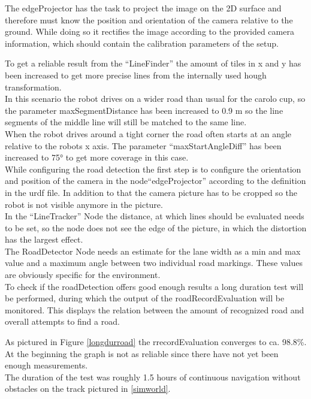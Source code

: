 The edgeProjector has the task to project the image on the 2D surface and therefore must know the position and orientation of the camera relative to the ground. While doing so it rectifies the image according to the provided camera information, which should contain the calibration parameters of the setup.

To get a reliable result from the ``LineFinder'' the amount of tiles in x and y has been increased to get more precise lines from the internally used hough transformation.\\
In this scenario the robot drives on a wider road than usual for the carolo cup, so the parameter maxSegmentDistance has been increased to 0.9 m so the line segments of the middle line will still be matched to the same line.\\
When the robot drives around a tight corner the road often starts at an angle relative to the robots x axis. The parameter ``maxStartAngleDiff'' has been increased to 75° to get more coverage in this case.\\

While configuring the road detection the first step is to configure the orientation and position of the camera in the node``edgeProjector'' according to the definition in the urdf file. In addition to that the camera picture has to be cropped so the robot is not visible anymore in the picture.\\

In the ``LineTracker'' Node the distance, at which lines should be evaluated needs to be set, so the node does not see the edge of the picture, in which the distortion has the largest effect.\\


The RoadDetector Node needs an estimate for the lane width as a min and max value and a maximum angle between two individual road markings. These values are obviously specific for the environment.\\

To check if the roadDetection offers good enough results a long duration test will be performed, during which the output of the roadRecordEvaluation will be monitored. This displays the relation between the amount of recognized road and overall attempts to find a road.

As pictured in Figure \ref{longdurroad} the rrecordEvaluation converges to ca. 98.8\%. At the beginning the graph is not as reliable since there have not yet been enough measurements.\\
The duration of the test was roughly 1.5 hours of continuous navigation without obstacles on the track pictured in \ref{simworld}.

